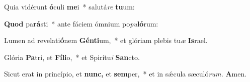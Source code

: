 \item Quia vidérunt \textbf{ó}culi \textbf{me}i~* salutá\textit{re} \textbf{tu}um:
\item \textbf{Quod} pa\textbf{rá}sti~* ante fáciem ó\-mnium po\textit{pu}\textbf{ló}rum:
\item Lumen ad revelati\textbf{ó}nem \textbf{Gén}\textbf{ti}um,~* et glóriam plebis tu\textit{æ} \textbf{Is}rael.
\item Glória \textbf{Pa}tri, et \textbf{Fí}\textbf{li}o,~* et Spirítu\textit{i} \textbf{San}cto.
\item Sicut erat in princípio, et \textbf{nunc,} et \textbf{sem}per,~* et in sǽcula sæculó\textit{rum.} \textbf{A}men.
